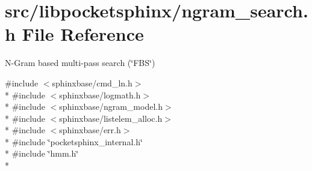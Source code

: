 \section{src/libpocketsphinx/ngram\+\_\+search.h File Reference}
\label{ngram__search_8h}


N-\/\+Gram based multi-\/pass search (\char`\"{}\+F\+B\+S\char`\"{})  


{\ttfamily \#include $<$sphinxbase/cmd\+\_\+ln.\+h$>$}\\*
{\ttfamily \#include $<$sphinxbase/logmath.\+h$>$}\\*
{\ttfamily \#include $<$sphinxbase/ngram\+\_\+model.\+h$>$}\\*
{\ttfamily \#include $<$sphinxbase/listelem\+\_\+alloc.\+h$>$}\\*
{\ttfamily \#include $<$sphinxbase/err.\+h$>$}\\*
{\ttfamily \#include \char`\"{}pocketsphinx\+\_\+internal.\+h\char`\"{}}\\*
{\ttfamily \#include \char`\"{}hmm.\+h\char`\"{}}\\*
